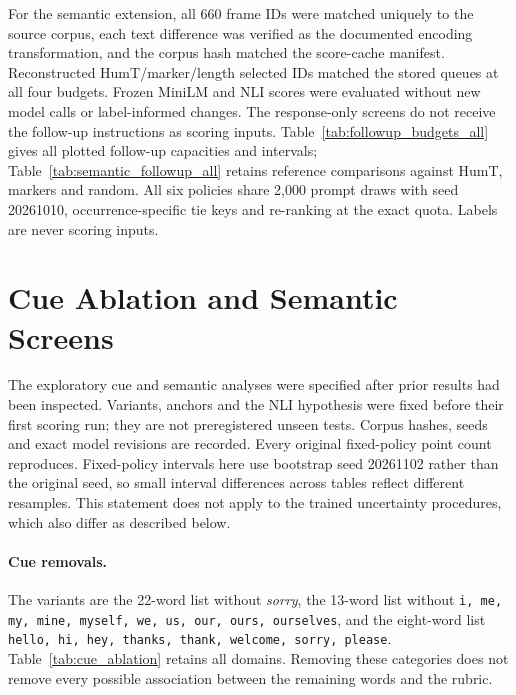 For the semantic extension, all 660 frame IDs were matched uniquely to the source corpus, each text difference was verified as the documented encoding transformation, and the corpus hash matched the score-cache manifest. Reconstructed HumT/marker/length selected IDs matched the stored queues at all four budgets. Frozen MiniLM and NLI scores were evaluated without new model calls or label-informed changes. The response-only screens do not receive the follow-up instructions as scoring inputs. Table~\ref{tab:followup_budgets_all} gives all plotted follow-up capacities and intervals; Table~\ref{tab:semantic_followup_all} retains reference comparisons against HumT, markers and random. All six policies share 2,000 prompt draws with seed 20261010, occurrence-specific tie keys and re-ranking at the exact quota. Labels are never scoring inputs.



\clearpage
\section{Cue Ablation and Semantic Screens}\label{app:extension}
The exploratory cue and semantic analyses were specified after prior results had been inspected. Variants, anchors and the NLI hypothesis were fixed before their first scoring run; they are not preregistered unseen tests. Corpus hashes, seeds and exact model revisions are recorded. Every original fixed-policy point count reproduces. Fixed-policy intervals here use bootstrap seed 20261102 rather than the original seed, so small interval differences across tables reflect different resamples. This statement does not apply to the trained uncertainty procedures, which also differ as described below.

\paragraph{Cue removals.}
The variants are the 22-word list without \emph{sorry}, the 13-word list without \texttt{i, me, my, mine, myself, we, us, our, ours, ourselves}, and the eight-word list \texttt{hello, hi, hey, thanks, thank, welcome, sorry, please}. Table~\ref{tab:cue_ablation} retains all domains. Removing these categories does not remove every possible association between the remaining words and the rubric.


